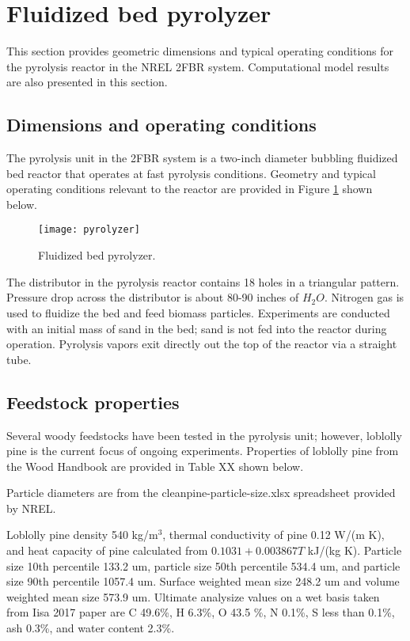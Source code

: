 
\section{Fluidized bed pyrolyzer}

This section provides geometric dimensions and typical operating conditions for the pyrolysis reactor in the NREL 2FBR system. Computational model results are also presented in this section.

\subsection{Dimensions and operating conditions}

The pyrolysis unit in the 2FBR system is a two-inch diameter bubbling fluidized bed reactor that operates at fast pyrolysis conditions. Geometry and typical operating conditions relevant to the reactor are provided in Figure \ref{fig:pyrolyzer} shown below.

\begin{figure}[H]
    \centering
    \texttt{[image: pyrolyzer]}
    \caption{Fluidized bed pyrolyzer.}
    \label{fig:pyrolyzer}
\end{figure}

The distributor in the pyrolysis reactor contains 18 holes in a triangular pattern. Pressure drop across the distributor is about 80-90 inches of $H_2O$. Nitrogen gas is used to fluidize the bed and feed biomass particles. Experiments are conducted with an initial mass of sand in the bed; sand is not fed into the reactor during operation. Pyrolysis vapors exit directly out the top of the reactor via a straight tube.

\subsection{Feedstock properties}

Several woody feedstocks have been tested in the pyrolysis unit; however, loblolly pine is the current focus of ongoing experiments. Properties of loblolly pine from the Wood Handbook are provided in Table XX shown below.

Particle diameters are from the cleanpine-particle-size.xlsx spreadsheet provided by NREL.

Loblolly pine density 540 kg/m$^3$, thermal conductivity of pine 0.12 W/(m K), and heat capacity of pine calculated from $0.1031 + 0.003867 T$ kJ/(kg K). Particle size 10th percentile 133.2 um, particle size 50th percentile 534.4 um, and particle size 90th percentile 1057.4 um. Surface weighted mean size 248.2 um and volume weighted mean size 573.9 um. Ultimate analysize values on a wet basis taken from Iisa 2017 paper are C 49.6\%, H 6.3\%, O 43.5 \%, N 0.1\%, S less than 0.1\%, ash 0.3\%, and water content 2.3\%.


